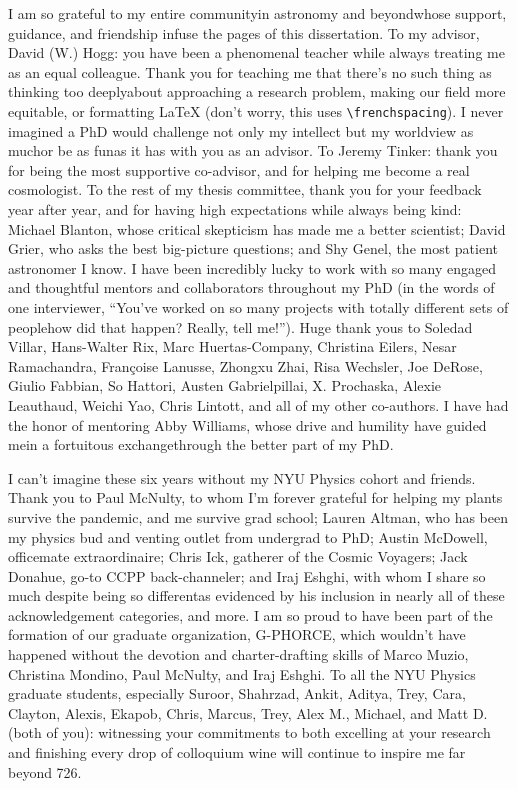 I am so grateful to my entire community{\emdash}in astronomy and beyond{\emdash}whose support, guidance, and friendship infuse the pages of this dissertation.
To my advisor, David (W.) Hogg: you have been a phenomenal teacher while always treating me as an equal colleague.
Thank you for teaching me that there's no such thing as thinking too deeply{\emdash}about approaching a research problem, making our field more equitable, or formatting {\LaTeX} (don't worry, this uses \verb|\frenchspacing|).
I never imagined a PhD would challenge not only my intellect but my worldview as much{\emdash}or be as fun{\emdash}as it has with you as an advisor.
To Jeremy Tinker: thank you for being the most supportive co-advisor, and for helping me become a real cosmologist.
To the rest of my thesis committee, thank you for your feedback year after year, and for having high expectations while always being kind: Michael Blanton, whose critical skepticism has made me a better scientist; David Grier, who asks the best big-picture questions; and Shy Genel, the most patient astronomer I know.
I have been incredibly lucky to work with so many engaged and thoughtful mentors and collaborators throughout my PhD (in the words of one interviewer, ``You've worked on so many projects with totally different sets of people{\emdash}how did that happen? Really, tell me!'').
Huge thank yous to Soledad Villar, Hans-Walter Rix, Marc Huertas-Company, Christina Eilers, Nesar Ramachandra, Fran\c{c}oise Lanusse, Zhongxu Zhai, Risa Wechsler, Joe DeRose, Giulio Fabbian, So Hattori, Austen Gabrielpillai, X. Prochaska, Alexie Leauthaud, Weichi Yao, Chris Lintott, and all of my other co-authors.
I have had the honor of mentoring Abby Williams, whose drive and humility have guided me{\emdash}in a fortuitous exchange{\emdash}through the better part of my PhD.

I can't imagine these six years without my NYU Physics cohort and friends. 
Thank you to Paul McNulty, to whom I'm forever grateful for helping my plants survive the pandemic, and me survive grad school; Lauren Altman, who has been my physics bud and venting outlet from undergrad to PhD; Austin McDowell, officemate extraordinaire; Chris Ick, gatherer of the Cosmic Voyagers; Jack Donahue, go-to CCPP back-channeler; and Iraj Eshghi, with whom I share so much despite being so different{\emdash}as evidenced by his inclusion in nearly all of these acknowledgement categories, and more.
I am so proud to have been part of the formation of our graduate organization, G-PHORCE, which wouldn't have happened without the devotion and charter-drafting skills of Marco Muzio, Christina Mondino, Paul McNulty, and Iraj Eshghi.
To all the NYU Physics graduate students, especially Suroor, Shahrzad, Ankit, Aditya, Trey, Cara, Clayton, Alexis, Ekapob, Chris, Marcus, Trey, Alex M., Michael, and Matt D. (both of you): witnessing your commitments to both excelling at your research and finishing every drop of colloquium wine will continue to inspire me far beyond 726.

